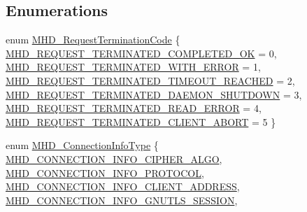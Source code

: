 \subsection*{\-Enumerations}
\begin{DoxyCompactItemize}
\item 
enum \hyperlink{group__request_gadc947d84fa56a9de3c0745b6357d74f7}{\-M\-H\-D\-\_\-\-Request\-Termination\-Code} \{ \*
\hyperlink{group__request_ggadc947d84fa56a9de3c0745b6357d74f7aab06b4b1332c0f58ef4f33afec32e129}{\-M\-H\-D\-\_\-\-R\-E\-Q\-U\-E\-S\-T\-\_\-\-T\-E\-R\-M\-I\-N\-A\-T\-E\-D\-\_\-\-C\-O\-M\-P\-L\-E\-T\-E\-D\-\_\-\-O\-K} =  0, 
\hyperlink{group__request_ggadc947d84fa56a9de3c0745b6357d74f7aafcc4bb487114f35da7a2dfca34eb0d6}{\-M\-H\-D\-\_\-\-R\-E\-Q\-U\-E\-S\-T\-\_\-\-T\-E\-R\-M\-I\-N\-A\-T\-E\-D\-\_\-\-W\-I\-T\-H\-\_\-\-E\-R\-R\-O\-R} =  1, 
\hyperlink{group__request_ggadc947d84fa56a9de3c0745b6357d74f7a091df7bca132a1a2dfd2a8ebaf4ed9e8}{\-M\-H\-D\-\_\-\-R\-E\-Q\-U\-E\-S\-T\-\_\-\-T\-E\-R\-M\-I\-N\-A\-T\-E\-D\-\_\-\-T\-I\-M\-E\-O\-U\-T\-\_\-\-R\-E\-A\-C\-H\-E\-D} =  2, 
\hyperlink{group__request_ggadc947d84fa56a9de3c0745b6357d74f7a9e95ed9a31037e8a95caa1e87a6b7a11}{\-M\-H\-D\-\_\-\-R\-E\-Q\-U\-E\-S\-T\-\_\-\-T\-E\-R\-M\-I\-N\-A\-T\-E\-D\-\_\-\-D\-A\-E\-M\-O\-N\-\_\-\-S\-H\-U\-T\-D\-O\-W\-N} =  3, 
\*
\hyperlink{group__request_ggadc947d84fa56a9de3c0745b6357d74f7adcf1eec5cf23be28658fff0c41e46973}{\-M\-H\-D\-\_\-\-R\-E\-Q\-U\-E\-S\-T\-\_\-\-T\-E\-R\-M\-I\-N\-A\-T\-E\-D\-\_\-\-R\-E\-A\-D\-\_\-\-E\-R\-R\-O\-R} =  4, 
\hyperlink{group__request_ggadc947d84fa56a9de3c0745b6357d74f7ae8b3d0bbf76722fcc99f0db2e0929726}{\-M\-H\-D\-\_\-\-R\-E\-Q\-U\-E\-S\-T\-\_\-\-T\-E\-R\-M\-I\-N\-A\-T\-E\-D\-\_\-\-C\-L\-I\-E\-N\-T\-\_\-\-A\-B\-O\-R\-T} =  5
 \}
\item 
enum \hyperlink{group__request_gacd49a2d4da7c25367ad62ce4ff030453}{\-M\-H\-D\-\_\-\-Connection\-Info\-Type} \{ \*
\hyperlink{group__request_ggacd49a2d4da7c25367ad62ce4ff030453a4e7240b06ae563abc3cad8fd087893b1}{\-M\-H\-D\-\_\-\-C\-O\-N\-N\-E\-C\-T\-I\-O\-N\-\_\-\-I\-N\-F\-O\-\_\-\-C\-I\-P\-H\-E\-R\-\_\-\-A\-L\-G\-O}, 
\hyperlink{group__request_ggacd49a2d4da7c25367ad62ce4ff030453af49b0be7cb939dd3b3252a1dc4f81ffc}{\-M\-H\-D\-\_\-\-C\-O\-N\-N\-E\-C\-T\-I\-O\-N\-\_\-\-I\-N\-F\-O\-\_\-\-P\-R\-O\-T\-O\-C\-O\-L}, 
\hyperlink{group__request_ggacd49a2d4da7c25367ad62ce4ff030453a7a49f845bb7fe32733c1fb9eff3aea9c}{\-M\-H\-D\-\_\-\-C\-O\-N\-N\-E\-C\-T\-I\-O\-N\-\_\-\-I\-N\-F\-O\-\_\-\-C\-L\-I\-E\-N\-T\-\_\-\-A\-D\-D\-R\-E\-S\-S}, 
\hyperlink{group__request_ggacd49a2d4da7c25367ad62ce4ff030453a3b6cc3dab82202305026f7271442f42c}{\-M\-H\-D\-\_\-\-C\-O\-N\-N\-E\-C\-T\-I\-O\-N\-\_\-\-I\-N\-F\-O\-\_\-\-G\-N\-U\-T\-L\-S\-\_\-\-S\-E\-S\-S\-I\-O\-N}, 

\end{DoxyCompactItemize}
